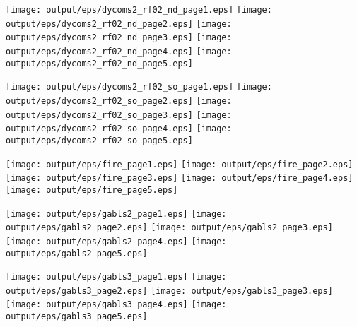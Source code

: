 \documentclass[11pt]{article}
\begin{document}
\begin{center}

\texttt{[image: output/eps/dycoms2\_rf02\_nd\_page1.eps]}
\texttt{[image: output/eps/dycoms2\_rf02\_nd\_page2.eps]}
\texttt{[image: output/eps/dycoms2\_rf02\_nd\_page3.eps]}
\texttt{[image: output/eps/dycoms2\_rf02\_nd\_page4.eps]}
\texttt{[image: output/eps/dycoms2\_rf02\_nd\_page5.eps]}
\end{center}
\newpage

\begin{center}

\texttt{[image: output/eps/dycoms2\_rf02\_so\_page1.eps]}
\texttt{[image: output/eps/dycoms2\_rf02\_so\_page2.eps]}
\texttt{[image: output/eps/dycoms2\_rf02\_so\_page3.eps]}
\texttt{[image: output/eps/dycoms2\_rf02\_so\_page4.eps]}
\texttt{[image: output/eps/dycoms2\_rf02\_so\_page5.eps]}
\end{center}
\newpage

\begin{center}

\texttt{[image: output/eps/fire\_page1.eps]}
\texttt{[image: output/eps/fire\_page2.eps]}
\texttt{[image: output/eps/fire\_page3.eps]}
\texttt{[image: output/eps/fire\_page4.eps]}
\texttt{[image: output/eps/fire\_page5.eps]}
\end{center}
\newpage

\begin{center}

\texttt{[image: output/eps/gabls2\_page1.eps]}
\texttt{[image: output/eps/gabls2\_page2.eps]}
\texttt{[image: output/eps/gabls2\_page3.eps]}
\texttt{[image: output/eps/gabls2\_page4.eps]}
\texttt{[image: output/eps/gabls2\_page5.eps]}
\end{center}
\newpage

\begin{center}

\texttt{[image: output/eps/gabls3\_page1.eps]}
\texttt{[image: output/eps/gabls3\_page2.eps]}
\texttt{[image: output/eps/gabls3\_page3.eps]}
\texttt{[image: output/eps/gabls3\_page4.eps]}
\texttt{[image: output/eps/gabls3\_page5.eps]}
\end{center}
\newpage
\end{document}
